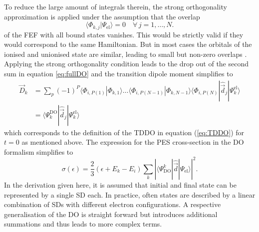 {To reduce the large amount of integrals therein, the strong orthogonality approximation is applied under the assumption that the overlap 
\begin{equation}
 \langle \Phi_{k,j}  |\Psi_\text{el}\rangle=0 \quad \forall\, j=1,\hdots, N.
\end{equation}
of the FEF with all bound states vanishes.
This would be strictly valid if they would correspond to the same Hamiltonian.
But in most cases the orbitals of the ionised and unionised state are similar, leading to small but non-zero overlaps \cite{saPonzi,GrellKuehn}.
Applying the strong orthogonality condition leads to the drop out of the second sum in equation \ref{eq:fullDO} and the transition dipole moment simplifies to
\begin{align} \label{eq:sigma_do}
\vec{D}_k&= \sum_p (-1)^P \langle \Phi_{i,P(1)}  |\Phi_{k,1} \rangle
            \hdots  \langle \Phi_{i,P(N-1)}|\Phi_{k,N-1} \rangle
                   \langle \Phi_{i,P(N)} |\hat{\vec{d}}_j |\Psi_k^\text{el}\rangle \nonumber \\
    &= \langle \Psi_k^\text{DO}| \hat{\vec{d}}_j| \Psi_k^\text{el}\rangle
\end{align}
which corresponds to the definition of the TDDO in equation (\ref{eq:TDDO}) for $t=0$ as mentioned above.
The expression for the PES cross-section in the DO formalism simplifies to
\begin{equation} \label{eq:DO_pes}
\sigma(\epsilon) =\frac 23 (\epsilon +E_k-E_i)
           \sum_k \left|  \langle \Psi^k_\text{DO} | \hat{\vec{d}} | \Psi_\text{el}\rangle  \right|^2 .
\end{equation}
In the derivation given here, it is assumed that initial and final state can be represented by a single SD each.
In practice, often states are described by a linear combination of SDs with different electron configurations.
A respective generalisation of the DO is straight forward but introduces additional summations and thus leads to more complex terms.

}
